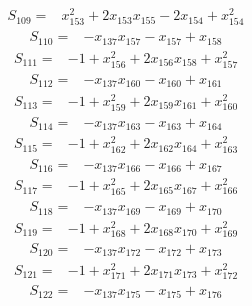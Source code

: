 \begin{align*}
S_{109}={}&x_{153}^{2}+2x_{153}x_{155}-2x_{154}+x_{154}^{2}
\end{align*}
\begin{align*}
S_{110}={}&-x_{137}x_{157}-x_{157}+x_{158}
\end{align*}
\begin{align*}
S_{111}={}&-1+x_{156}^{2}+2x_{156}x_{158}+x_{157}^{2}
\end{align*}
\begin{align*}
S_{112}={}&-x_{137}x_{160}-x_{160}+x_{161}
\end{align*}
\begin{align*}
S_{113}={}&-1+x_{159}^{2}+2x_{159}x_{161}+x_{160}^{2}
\end{align*}
\begin{align*}
S_{114}={}&-x_{137}x_{163}-x_{163}+x_{164}
\end{align*}
\begin{align*}
S_{115}={}&-1+x_{162}^{2}+2x_{162}x_{164}+x_{163}^{2}
\end{align*}
\begin{align*}
S_{116}={}&-x_{137}x_{166}-x_{166}+x_{167}
\end{align*}
\begin{align*}
S_{117}={}&-1+x_{165}^{2}+2x_{165}x_{167}+x_{166}^{2}
\end{align*}
\begin{align*}
S_{118}={}&-x_{137}x_{169}-x_{169}+x_{170}
\end{align*}
\begin{align*}
S_{119}={}&-1+x_{168}^{2}+2x_{168}x_{170}+x_{169}^{2}
\end{align*}
\begin{align*}
S_{120}={}&-x_{137}x_{172}-x_{172}+x_{173}
\end{align*}
\begin{align*}
S_{121}={}&-1+x_{171}^{2}+2x_{171}x_{173}+x_{172}^{2}
\end{align*}
\begin{align*}
S_{122}={}&-x_{137}x_{175}-x_{175}+x_{176}
\end{align*}
